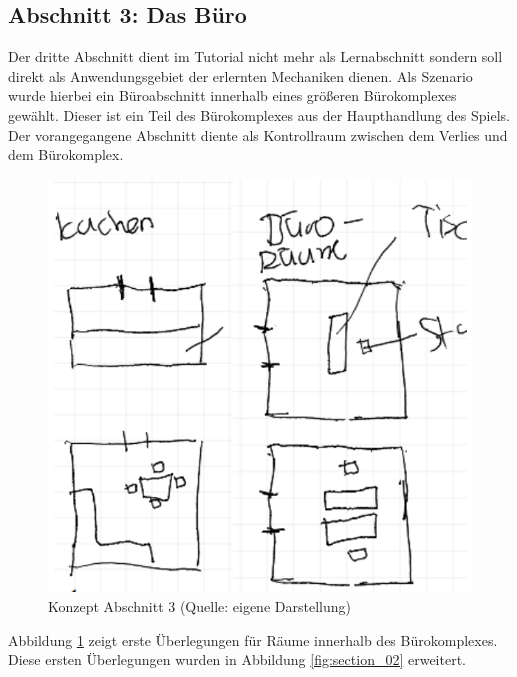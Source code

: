\subsection{Abschnitt 3: Das Büro}
Der dritte Abschnitt dient im Tutorial nicht mehr als Lernabschnitt sondern soll direkt als Anwendungsgebiet der erlernten Mechaniken dienen.
Als Szenario wurde hierbei ein Büroabschnitt innerhalb eines größeren Bürokomplexes gewählt. Dieser ist ein Teil des Bürokomplexes aus der Haupthandlung des Spiels. Der vorangegangene Abschnitt diente als Kontrollraum zwischen dem Verlies und dem Bürokomplex.

\begin{figure}[ht]
\centering
\includegraphics[width=1\linewidth]{content/pictures/Abschnitt_02_Concept.png}
\caption{Konzept Abschnitt 3 (Quelle: eigene Darstellung)}
\label{fig:section_02_concept}
\end{figure}

Abbildung \ref{fig:section_02_concept} zeigt erste Überlegungen für Räume innerhalb des Bürokomplexes. Diese ersten Überlegungen wurden in Abbildung \ref{fig:section_02} erweitert.

